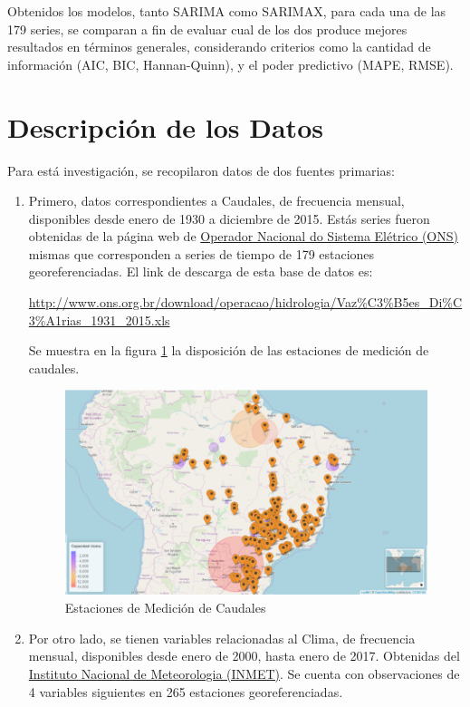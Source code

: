 \documentclass[12pt,oneside]{book}\usepackage[]{graphicx}\usepackage[]{color}
\theoremstyle{definition} %
\begin{document}
Obtenidos los modelos, tanto SARIMA como SARIMAX, para cada una de las 179 series, se comparan a fin de evaluar cual de los dos produce mejores resultados en términos generales, considerando criterios como la cantidad de información (AIC, BIC, Hannan-Quinn), y el poder predictivo (MAPE, RMSE).


\section{Descripción de los Datos}

Para está investigación, se recopilaron datos de dos fuentes primarias:

\begin{enumerate}

\item Primero, datos correspondientes a Caudales, de frecuencia mensual, disponibles desde enero de 1930 a diciembre de 2015. Estás series fueron obtenidas de la página web de \href{http://www.ons.org.br/}{Operador Nacional do Sistema Elétrico (ONS)} mismas que corresponden a series de tiempo de 179 estaciones georeferenciadas. El link de descarga de esta base de datos es:

\url{http://www.ons.org.br/download/operacao/hidrologia/Vaz%C3%B5es_Di%C3%A1rias_1931_2015.xls}

Se muestra en la figura \ref{fig:mapa_vaz} la disposición de las estaciones de medición de caudales.


\begin{figure}[H]
	\centering
	\includegraphics[scale=0.5]{map_estacVz}
	\caption{Estaciones de Medición de Caudales}\label{fig:mapa_vaz}
\end{figure}



\item Por otro lado, se tienen variables relacionadas al Clima, de frecuencia mensual, disponibles desde enero de 2000, hasta enero de 2017. Obtenidas del \href{http://www.inmet.gov.br/portal/}{Instituto Nacional de Meteorologia (INMET)}. Se cuenta con observaciones de 4 variables siguientes en 265 estaciones georeferenciadas.


\end{enumerate}
\end{document}
